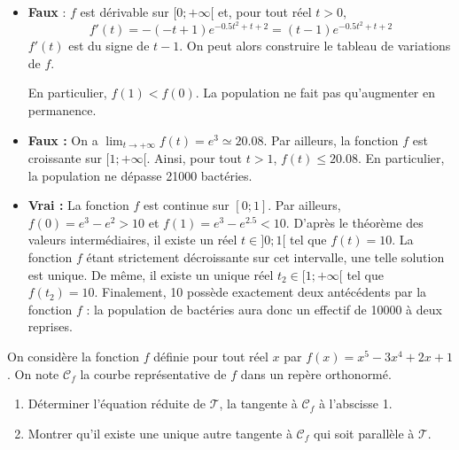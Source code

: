 \documentclass[11pt,fleqn, openany]{book} %
\begin{document}
\begin{solution}\hspace{0pt}

\begin{itemize}
\item  \textbf{Faux} : $f$ est dérivable sur $[0;+\infty[$ et, pour tout réel $t>0$, \[f'(t)=-(-t+1)e^{-0.5t^2+t+2}=(t-1)e^{-0.5t^2+t+2}\] $f'(t)$ est du signe de $t-1$. On peut alors construire le tableau de variations de $f$.

\begin{center}
\end{center}

En particulier, $f(1)<f(0)$. La population ne fait pas qu'augmenter en permanence.
\item \textbf{Faux :}  On a $\displaystyle\lim_{t\to+\infty}f(t)=e^3 \simeq 20.08$. Par ailleurs, la fonction $f$ est croissante sur $[1;+\infty[$. Ainsi, pour tout $t>1$, $f(t)\leqslant 20.08$. En particulier, la population ne dépasse 21000 bactéries.

\item \textbf{Vrai : } La fonction $f$ est continue sur $[0;1]$. Par ailleurs, $f(0)=e^3-e^2 >10$ et $f(1)=e^3-e^{2.5}<10$. D'après le théorème des valeurs intermédiaires, il existe un réel $t\in ]0;1[$ tel que $f(t)=10$. La fonction $f$ étant strictement décroissante sur cet intervalle, une telle solution est unique. De même, il existe un unique réel $t_2 \in [1;+\infty[$ tel que $f(t_2)=10$. Finalement, 10 possède exactement deux antécédents par la fonction $f$ : la population de bactéries aura donc un effectif de 10000 à deux reprises.\end{itemize}

\end{solution}




\begin{exercise}On considère la fonction $f$ définie pour tout réel $x$ par $f(x)=x^5-3x^4+2x+1$. On note $\mathcal{C}_f$ la courbe représentative de $f$ dans un repère orthonormé.
\begin{enumerate}
\item Déterminer l'équation réduite de $\mathcal{T}$, la tangente à $\mathcal{C}_f$ à l'abscisse 1.
\item Montrer qu'il existe une unique autre tangente à $\mathcal{C}_f$ qui soit parallèle à $\mathcal{T}$. 
\end{enumerate}
\end{exercise}
\end{document}
